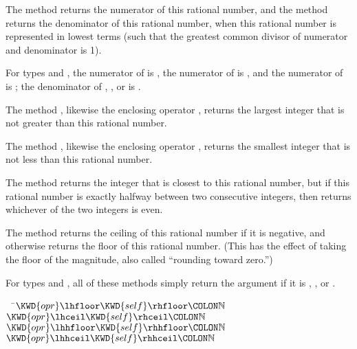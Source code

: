 
The method  returns the numerator of this rational number,
and the method  returns the denominator of this rational number,
when this rational number is represented in lowest terms (such that the greatest common divisor
of numerator and denominator is 1).

For types  and ,
the numerator of \EXP{+\infty} is ,
the numerator of \EXP{-\infty} is ,
and the numerator of  is ;
the denominator of \EXP{+\infty}, \EXP{-\infty}, or  is .



The method , likewise the enclosing operator \EXP{\lfloor\ldots\rfloor},
returns the largest integer that is not greater than this rational number.

The method , likewise the enclosing operator \EXP{\lceil\ldots\rceil},
returns the smallest integer that is not less than this rational number.

The method  returns the integer that is closest to this rational number,
but if this rational number is exactly halfway between two consecutive integers,
then  returns whichever of the two integers is even.

The method  returns the ceiling of this rational number if it is
negative, and otherwise returns the floor of this rational number.
(This has the effect of taking the floor of the magnitude, also called
``rounding toward zero.'')

For types  and ,
all of these methods simply return the argument if it is
\EXP{+\infty}, \EXP{-\infty}, or .


\begin{Fortress}
{\tt~~}\pushtabs\=\+\(  \KWD{opr} \lhfloor \mathord{\KWD{self}} \rhfloor\COLON \mathbb{N}\)\\
\(  \KWD{opr} \lhceil \mathord{\KWD{self}} \rhceil\COLON \mathbb{N}\)\\
\(  \KWD{opr} \lhhfloor \mathord{\KWD{self}} \rhhfloor\COLON \mathbb{N}\)\\
\(  \KWD{opr} \lhhceil \mathord{\KWD{self}} \rhhceil\COLON \mathbb{N}\)\-\\\poptabs
\end{Fortress}

